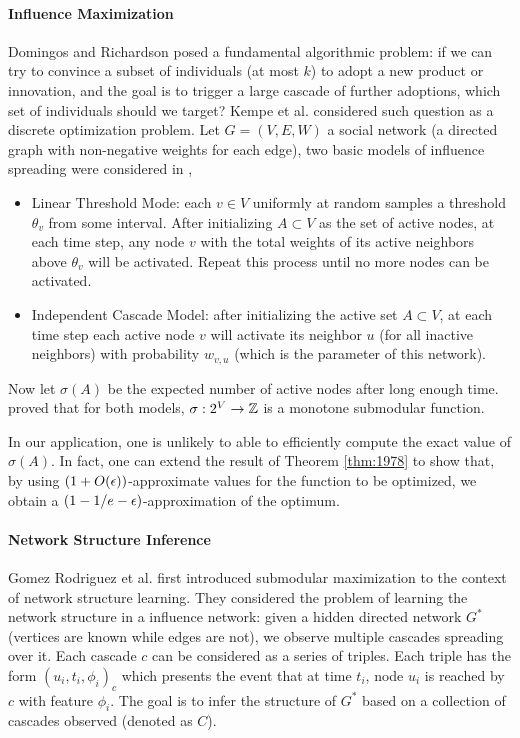 \paragraph{Influence Maximization}
Domingos and Richardson \cite{DR01,RD02} posed a fundamental algorithmic problem: if we can try to convince a subset of individuals (at most $k$) to adopt a new product or innovation, and the goal is to trigger a large cascade of further adoptions, which set of individuals should we target? 
Kempe et al. \cite{KKT03} considered such question as a discrete optimization problem. Let $G = (V, E, W)$ a social network (a directed graph with non-negative weights for each edge), two basic models of influence spreading were considered in \cite{KKT03},
\begin{itemize}
\item Linear Threshold Mode: each $v\in V$ uniformly at random samples a threshold $\theta_v$ from some interval. After initializing $A \subset V$ as the set of active nodes, at each time step, any node $v$ with the total weights of its active neighbors above $\theta_v$ will be activated. Repeat this process until no more nodes can be activated. 

\item Independent Cascade Model:  after initializing the active set $A \subset V$, at each time step each active node $v$ will activate its neighbor $u$ (for all inactive neighbors) with probability $w_{v,u}$ (which is the parameter of this network).
\end{itemize}

Now let $\sigma(A)$ be the expected number of active nodes after long enough time. \cite{KKT03} proved that for both models, $\sigma: 2^V \rightarrow \mathbb{Z}$ is a monotone submodular function.


In our application, one is unlikely to able to efficiently compute the exact value of $\sigma(A)$. In fact, one can extend the result of Theorem \ref{thm:1978} to show that, by using  $(1 + O(\epsilon))$-approximate values for the function to be optimized, we obtain a $(1 - 1/e - \epsilon)$-approximation of the optimum.


\paragraph{Network Structure Inference}
Gomez Rodriguez et al. \cite{GLK10} first introduced submodular maximization to the context of network structure learning. They considered the problem of learning the network structure in a influence network: given a hidden directed network $G^*$ (vertices are known while edges are not), we observe multiple cascades spreading over it. Each cascade $c$ can be considered as a series of triples. Each triple has the form $(u_i, t_i, \phi_i)_c$ which presents the event that at time $t_i$, node $u_i$ is reached by $c$ with feature $\phi_i$. The goal is to infer the structure of $G^*$ based on a collection of cascades observed (denoted as $C$).

